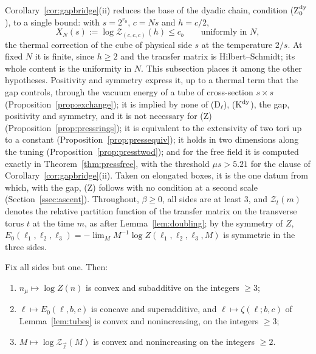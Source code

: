 Corollary~\ref{cor:gapbridge}(ii) reduces the base of the dyadic chain,
condition (Z$_0^{\rm dy}$), to a single bound: with $s=2^{r_0}$, $c=Ns$ and
$h=c/2$,
\begin{equation}\label{eq:pressureX}
X_N(s):=\log\mathcal Z_{(c,c,c)}(h)\le c_b\qquad\text{uniformly in }N,
\end{equation}
the thermal correction of the cube of physical side $s$ at the temperature
$2/s$. At fixed $N$ it is finite, since $h\ge2$ and the transfer matrix is
Hilbert--Schmidt; its whole content is the uniformity in $N$. This
subsection places it among the other hypotheses. Positivity and symmetry
express it, up to a thermal term that the gap controls, through the vacuum
energy of a tube of cross-section $s\times s$ (Proposition~\ref{prop:exchange});
it is implied by none of (D$_\ell$), (K$^{\rm dy}$), the gap, positivity and
symmetry, and it is not necessary for (Z) (Proposition~\ref{prop:pressrings});
it is equivalent to the extensivity of two tori up to a constant
(Proposition~\ref{prop:pressequiv}); it holds in two dimensions along the
tuning (Proposition~\ref{prop:presstwod}); and for the free field it is
computed exactly in Theorem~\ref{thm:pressfree}, with the threshold $\mu s>
5.21$ for the clause of Corollary~\ref{cor:gapbridge}(ii). Taken on
elongated boxes, it is the one datum from which, with the gap, (Z) follows
with no condition at a second scale (Section~\ref{ssec:ascent}). Throughout,
$\beta\ge0$, all sides are at least $3$, and $\mathcal Z_t(m)$ denotes the
relative partition function of the transfer matrix on the transverse torus
$t$ at the time $m$, as after Lemma~\ref{lem:doubling}; by the symmetry of
$Z$, $E_0(\ell_1,\ell_2,\ell_3)=-\lim_MM^{-1}\log Z(\ell_1,\ell_2,\ell_3,M)$
is symmetric in the three sides.

\begin{lemma}\label{lem:pressconvex}
Fix all sides but one. Then:
\begin{enumerate}[label=\textup{(\roman*)},leftmargin=*]
\item $n_\mu\mapsto\log Z(n)$ is convex and subadditive on the integers
$\ge3$;
\item $\ell\mapsto E_0(\ell,b,c)$ is concave and superadditive, and $\ell
\mapsto\zeta(\ell;b,c)$ of Lemma~\ref{lem:tubes} is convex and nonincreasing,
on the integers $\ge3$;
\item $M\mapsto\log\mathcal Z_{\vec\ell}(M)$ is convex and nonincreasing on
the integers $\ge2$.
\end{enumerate}
\end{lemma}

